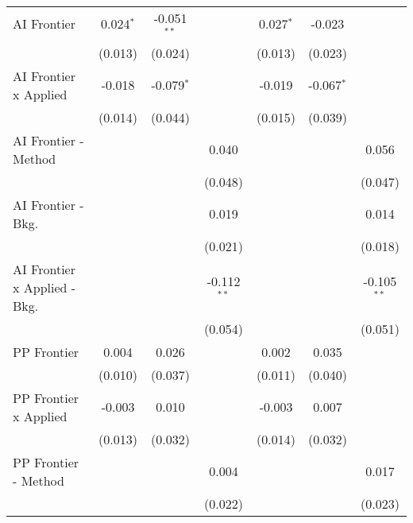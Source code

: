 \begin{tabular}{lcccccc}
   AI Frontier                    & 0.024$^{*}$  & -0.051$^{**}$ &               & 0.027$^{*}$  & -0.023       &   \\   
                                  & (0.013)      & (0.024)       &               & (0.013)      & (0.023)      &   \\   
   AI Frontier x Applied          & -0.018       & -0.079$^{*}$  &               & -0.019       & -0.067$^{*}$ &   \\   
                                  & (0.014)      & (0.044)       &               & (0.015)      & (0.039)      &   \\   
   AI Frontier - Method           &              &               & 0.040         &              &              & 0.056\\   
                                  &              &               & (0.048)       &              &              & (0.047)\\   
   AI Frontier - Bkg.             &              &               & 0.019         &              &              & 0.014\\   
                                  &              &               & (0.021)       &              &              & (0.018)\\   
   AI Frontier x Applied - Bkg.   &              &               & -0.112$^{**}$ &              &              & -0.105$^{**}$\\   
                                  &              &               & (0.054)       &              &              & (0.051)\\   
   PP Frontier                    & 0.004        & 0.026         &               & 0.002        & 0.035        &   \\   
                                  & (0.010)      & (0.037)       &               & (0.011)      & (0.040)      &   \\   
   PP Frontier x Applied          & -0.003       & 0.010         &               & -0.003       & 0.007        &   \\   
                                  & (0.013)      & (0.032)       &               & (0.014)      & (0.032)      &   \\   
   PP Frontier - Method           &              &               & 0.004         &              &              & 0.017\\   
                                  &              &               & (0.022)       &              &              & (0.023)\\   

\end{tabular}
